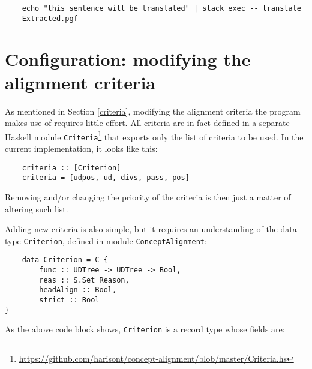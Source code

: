 \begin{verbatim}
    echo "this sentence will be translated" | stack exec -- translate
    Extracted.pgf             
\end{verbatim}

\section{Configuration: modifying the alignment criteria}
As mentioned in Section \ref{criteria}, modifying the alignment criteria the program makes use of requires little effort. 
All criteria are in fact defined in a separate Haskell module \texttt{Criteria}\footnote{\url{https://github.com/harisont/concept-alignment/blob/master/Criteria.hs}} that exports only the list of criteria to be used. 
In the current implementation, it looks like this: \smallskip

\begin{lstlisting}
    criteria :: [Criterion]
    criteria = [udpos, ud, divs, pass, pos]
\end{lstlisting}

Removing and/or changing the priority of the criteria is then just a matter of altering such list. \smallskip

Adding new criteria is also simple, but it requires an understanding of the data type \texttt{Criterion}, defined in module \texttt{ConceptAlignment}:

\begin{lstlisting}
    data Criterion = C {
        func :: UDTree -> UDTree -> Bool, 
        reas :: S.Set Reason,
        headAlign :: Bool,
        strict :: Bool
}
\end{lstlisting}

As the above code block shows, \texttt{Criterion} is a record type whose fields are:

